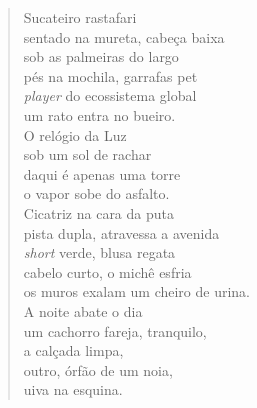 \begin{verse}
Sucateiro rastafari\\
sentado na mureta, cabeça baixa\\
sob as palmeiras do largo\\
pés na mochila, garrafas pet\\[5pt]
\emph{player} do ecossistema global\\
um rato entra no bueiro.\\
O relógio da Luz\\
sob um sol de rachar\\[5pt]
daqui é apenas uma torre\\
o vapor sobe do asfalto.\\
Cicatriz na cara da puta\\
pista dupla, atravessa a avenida\\[5pt]
\emph{short} verde, blusa regata\\
cabelo curto, o michê esfria\\
os muros exalam um cheiro de urina.\\
A noite abate o dia\\[5pt]
um cachorro fareja, tranquilo,\\
a calçada limpa,\\
outro, órfão de um noia,\\
uiva na esquina.
\end{verse}

\pagebreak

